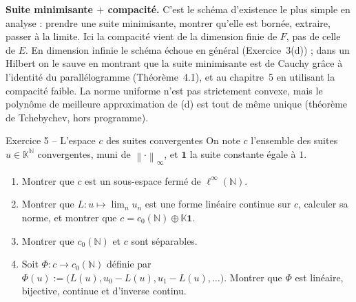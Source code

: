 \documentclass[11pt,a4paper]{article}
\newcommand{\N}{\mathbb{N}}
\newcommand{\K}{\mathbb{K}}
\newcommand{\norm}[1]{\left\|#1\right\|}
\theoremstyle{definition}
\begin{document}
\begin{commentaire}
\textbf{Suite minimisante $+$ compacité.} C'est le schéma d'existence le plus simple en analyse : prendre une suite minimisante, montrer qu'elle est bornée, extraire, passer à la limite. Ici la compacité vient de la dimension finie de $F$, pas de celle de $E$. En dimension infinie le schéma échoue en général (Exercice~3(d)) ; dans un Hilbert on le sauve en montrant que la suite minimisante est de Cauchy grâce à l'identité du parallélogramme (Théorème~4.1), et au chapitre~5 en utilisant la compacité faible. La norme uniforme n'est pas strictement convexe, mais le polynôme de meilleure approximation de (d) est tout de même unique (théorème de Tchebychev, hors programme).
\end{commentaire}

\begin{exo}{Exercice 5 -- L'espace $c$ des suites convergentes}
On note $c$ l'ensemble des suites $u\in\K^\N$ convergentes, muni de $\norm\cdot_\infty$, et $\mathbf 1$ la suite constante égale à $1$.
\begin{enumerate}[label=(\alph*)]
  \item Montrer que $c$ est un sous-espace fermé de $\ell^\infty(\N)$.
  \item Montrer que $L:u\mapsto\lim_nu_n$ est une forme linéaire continue sur $c$, calculer sa norme, et montrer que $c=c_0(\N)\oplus\K\mathbf 1$.
  \item Montrer que $c_0(\N)$ et $c$ sont séparables.
  \item Soit $\Phi:c\to c_0(\N)$ définie par $\Phi(u):=\big(L(u),u_0-L(u),u_1-L(u),\dots\big)$. Montrer que $\Phi$ est linéaire, bijective, continue et d'inverse continu.
\end{enumerate}
\end{exo}
\end{document}
